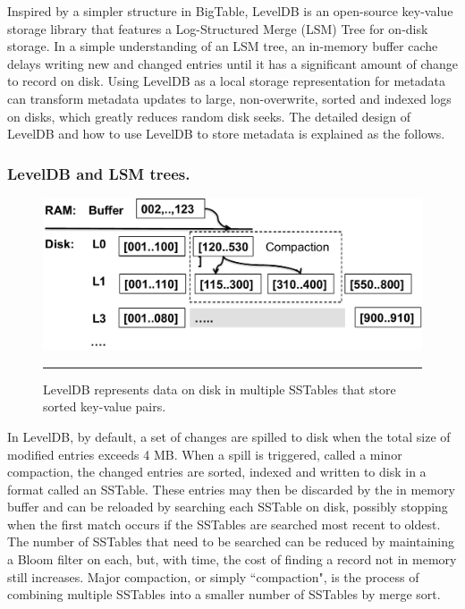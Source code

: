 Inspired by a simpler structure in BigTable\cite{BigTable}, 
LevelDB \cite{LevelDB} is an open-source key-value storage library
that features a Log-Structured Merge (LSM) Tree \cite{ONeil1996} for on-disk storage.
In a simple understanding of an LSM tree, an in-memory buffer cache delays 
writing new and changed entries until it has a significant amount of change to record on disk.
Using LevelDB as a local storage representation for metadata  
can transform metadata updates to large, non-overwrite, sorted and indexed logs on disks,
which greatly reduces random disk seeks.
The detailed design of LevelDB and how to use LevelDB to store metadata is explained as the follows.

\subsubsection*{LevelDB and LSM trees. }

\begin{figure}[t]
\centering
\includegraphics[scale=0.4]{figs/leveldb}
\caption{LevelDB represents data on disk in multiple SSTables that store sorted key-value pairs.}
\vspace{10pt}
\hrule 
\label{fig:leveldb}
\end{figure}


In LevelDB, by default, a set of changes are spilled to disk when the total
size of modified entries exceeds 4 MB.  When a spill is triggered, called a
minor compaction, the changed entries are sorted, indexed and written to disk
in a format called an SSTable\cite{BigTable}.  These entries may then be
discarded by the in memory buffer and can be reloaded by searching each SSTable
on disk, possibly stopping when the first match occurs if the SSTables are
searched most recent to oldest.  The number of SSTables that need to be
searched can be reduced by maintaining a Bloom filter\cite{bloomfilter} on
each, but, with time, the cost of finding a record not in memory still increases.  Major compaction, or simply ``compaction", is the process of combining multiple SSTables into a smaller number of SSTables by merge sort. 


